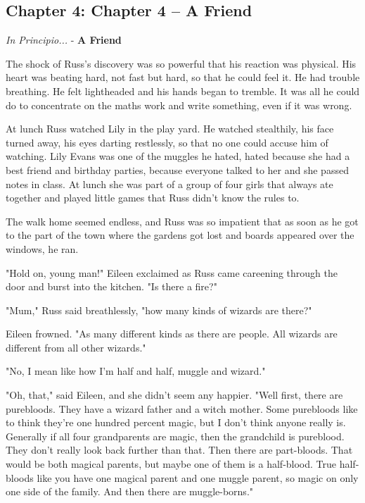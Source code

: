 \documentclass[a4paper,11pt]{article}
\begin{document}
\subsection{Chapter 4: Chapter 4 – A Friend}

\emph{In Principio...} - \textbf{A Friend}

The shock of Russ's discovery was so powerful that his reaction was physical. His heart was beating hard, not fast but hard, so that he could feel it. He had trouble breathing. He felt lightheaded and his hands began to tremble. It was all he could do to concentrate on the maths work and write something, even if it was wrong.

At lunch Russ watched Lily in the play yard. He watched stealthily, his face turned away, his eyes darting restlessly, so that no one could accuse him of watching. Lily Evans was one of the muggles he hated, hated because she had a best friend and birthday parties, because everyone talked to her and she passed notes in class. At lunch she was part of a group of four girls that always ate together and played little games that Russ didn't know the rules to.

The walk home seemed endless, and Russ was so impatient that as soon as he got to the part of the town where the gardens got lost and boards appeared over the windows, he ran.

"Hold on, young man!" Eileen exclaimed as Russ came careening through the door and burst into the kitchen. "Is there a fire?"

"Mum," Russ said breathlessly, "how many kinds of wizards are there?"

Eileen frowned. "As many different kinds as there are people. All wizards are different from all other wizards."

"No, I mean like how I'm half and half, muggle and wizard."

"Oh, that," said Eileen, and she didn't seem any happier. "Well first, there are purebloods. They have a wizard father and a witch mother. Some purebloods like to think they're one hundred percent magic, but I don't think anyone really is. Generally if all four grandparents are magic, then the grandchild is pureblood. They don't really look back further than that. Then there are part-bloods. That would be both magical parents, but maybe one of them is a half-blood. True half-bloods like you have one magical parent and one muggle parent, so magic on only one side of the family. And then there are muggle-borns."
\end{document}
